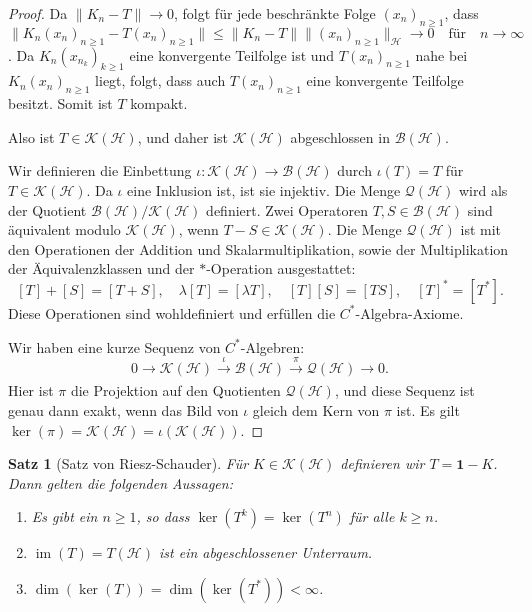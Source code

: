 \documentclass[11pt, hidelinks]{article}
\newcommand{\h}{\mathcal{H}}
\newcommand{\im}{\operatorname{im}}
\numberwithin{conj}{section}
\newtheorem{theorem}[conj]{Satz}
\begin{document}
\begin{proof}
{Da \(\|K_n - T\| \to 0\), folgt für jede beschränkte Folge \((x_n)_{n\geq 1}\), dass $\|K_n(x_n)_{n\geq 1} - T(x_n)_{n\geq 1}\| \leq \|K_n - T\| \|(x_n)_{n\geq 1}\|_\h \to 0 \quad \text{für} \quad n \to \infty$. Da \(K_n(x_{n_k})_{k\geq 1}\) eine konvergente Teilfolge ist und \(T(x_n)_{n\geq 1}\) nahe bei \(K_n(x_n)_{n\geq 1}\) liegt, folgt, dass auch \(T(x_n)_{n\geq 1}\) eine konvergente Teilfolge besitzt. Somit ist \(T\) kompakt.

Also ist \(T \in \mathcal{K}(\mathcal{H})\), und daher ist \(\mathcal{K}(\mathcal{H})\) abgeschlossen in \(\mathcal{B}(\mathcal{H})\). }

Wir definieren die Einbettung $\iota: \mathcal{K}(\mathcal{H}) \to \mathcal{B}(\mathcal{H})$ durch $\iota(T) = T$ für $T \in \mathcal{K}(\mathcal{H})$. Da $\iota$ eine Inklusion ist, ist sie injektiv. Die Menge $\mathcal{Q}(\mathcal{H})$ wird als der Quotient $\mathcal{B}(\mathcal{H}) / \mathcal{K}(\mathcal{H})$ definiert. Zwei Operatoren $T, S \in \mathcal{B}(\mathcal{H})$ sind äquivalent modulo $\mathcal{K}(\mathcal{H})$, wenn $T - S \in \mathcal{K}(\mathcal{H})$. Die Menge $\mathcal{Q}(\mathcal{H})$ ist mit den Operationen der Addition und Skalarmultiplikation, sowie der Multiplikation der Äquivalenzklassen und der $\ast$-Operation ausgestattet:
   \[
   [T] + [S] = [T + S], \quad \lambda[T] = [\lambda T], \quad [T][S] = [TS], \quad [T]^\ast = [T^\ast].
   \]
Diese Operationen sind wohldefiniert und erfüllen die $C^\ast$-Algebra-Axiome.

Wir haben eine kurze Sequenz von $C^\ast$-Algebren:
   \[
   0 \to \mathcal{K}(\mathcal{H}) \xrightarrow[]{\iota} \mathcal{B}(\mathcal{H}) \xrightarrow[]{\pi} \mathcal{Q}(\mathcal{H}) \to 0.
   \]
Hier ist $\pi$ die Projektion auf den Quotienten $\mathcal{Q}(\mathcal{H})$, und diese Sequenz ist genau dann exakt, wenn das Bild von $\iota$ gleich dem Kern von $\pi$ ist. Es gilt $\ker(\pi) = \mathcal{K}(\h) = \iota(\mathcal{K}(\h))$.
\end{proof}

\begin{theorem}[Satz von Riesz-Schauder]
Für $K \in \mathcal{K}(\h)$ definieren wir $T = \mathbf{1}-K$. Dann gelten die folgenden Aussagen:
\begin{enumerate}
    \item Es gibt ein $n \geq 1$, so dass $\ker(T^k) = \ker(T^n)$ für alle $k \geq n$.
    \item $\im(T) = T(\h)$ ist ein abgeschlossener Unterraum.
    \item $\dim(\ker(T)) = \dim(\ker(T^\ast)) < \infty$.
\end{enumerate}
\end{theorem}
\end{document}
